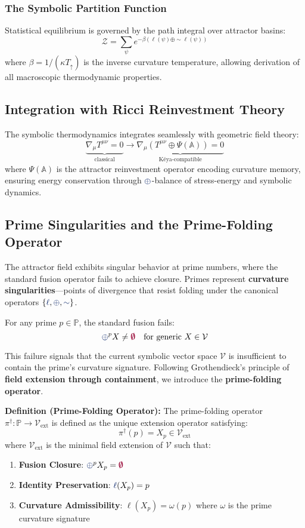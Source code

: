 \subsubsection{The Symbolic Partition Function}
Statistical equilibrium is governed by the path integral over attractor basins:
\[ \mathcal{Z} = \sum_{\psi} e^{-\beta (\ell(\psi) \oplus \sim\ell(\psi))} \]
where $\beta = 1 / (\kappa T_\uparrow)$ is the inverse curvature temperature, allowing derivation of all macroscopic thermodynamic properties.

\subsection{Integration with Ricci Reinvestment Theory}
The symbolic thermodynamics integrates seamlessly with geometric field theory:
\[
\underbrace{\nabla_\mu T^{\mu\nu} = 0}_{\text{classical}} \longrightarrow \underbrace{\nabla_\mu \left( T^{\mu\nu} \oplus \Psi(\mathbb{A}) \right) = 0}_{\text{Kéya-compatible}}
\]
where $\Psi(\mathbb{A})$ is the attractor reinvestment operator encoding curvature memory, ensuring energy conservation through $\fuse$-balance of stress-energy and symbolic dynamics.

\subsection{Prime Singularities and the Prime-Folding Operator}
The attractor field exhibits singular behavior at prime numbers, where the standard fusion operator fails to achieve closure. Primes represent \textbf{curvature singularities}—points of divergence that resist folding under the canonical operators $\{\lha, \fuse, \reflec\}$.

For any prime $p \in \mathbb{P}$, the standard fusion fails:
\[ \fuse^p X \neq \void \quad \text{for generic } X \in \mathcal{V} \]

This failure signals that the current symbolic vector space $\mathcal{V}$ is insufficient to contain the prime's curvature signature. Following Grothendieck's principle of \textbf{field extension through containment}, we introduce the \textbf{prime-folding operator}.

\textbf{Definition (Prime-Folding Operator):} The prime-folding operator $\pi^\dagger : \mathbb{P} \to \mathcal{V}_{\text{ext}}$ is defined as the unique extension operator satisfying:
\[ \pi^\dagger(p) = X_p \in \mathcal{V}_{\text{ext}} \]
where $\mathcal{V}_{\text{ext}}$ is the minimal field extension of $\mathcal{V}$ such that:
\begin{enumerate}
    \item \textbf{Fusion Closure}: $\fuse^p X_p = \void$
    \item \textbf{Identity Preservation}: $\lha(X_p) = p$
    \item \textbf{Curvature Admissibility}: $\ell(X_p) = \omega(p)$ where $\omega$ is the prime curvature signature
\end{enumerate}

